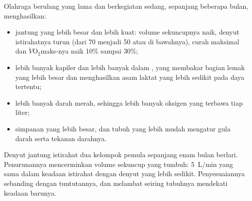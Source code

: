 \begin{proposition}\label{prop:g10:sport-and-health:endurance}
Olahraga berulang yang lama dan berkegiatan sedang, sepanjang beberapa
bulan, menghasilkan:
\begin{itemize}
  \item jantung yang lebih besar dan lebih kuat: volume sekuncupnya
        naik, denyut istirahatnya turun (dari 70 menjadi 50 atau di
        bawahnya), curah maksimal dan $\dot V\!\mathrm{O_2}$maks-nya
        naik 10\% sampai 30\%;
  \item lebih banyak kapiler dan lebih banyak  dalam , yang membakar bagian lemak yang lebih besar dan
        menghasilkan asam laktat yang lebih sedikit pada daya tertentu;
  \item lebih banyak  darah merah, sehingga lebih banyak oksigen
        yang terbawa tiap liter;
  \item simpanan  yang lebih besar, dan tubuh yang lebih mudah
        mengatur gula darah serta tekanan darahnya.
\end{itemize}
\end{proposition}
\admitted

\begin{omfigure}

{\small Denyut jantung istirahat dua kelompok pemula sepanjang enam
bulan berlari. Penurunannya mencerminkan volume sekuncup yang tumbuh:
\qty{5}{L/min} yang sama dalam keadaan istirahat dengan denyut yang
lebih sedikit. Penyesuaiannya sebanding dengan tuntutannya, dan
melambat seiring tubuhnya mendekati keadaan barunya.}
\end{omfigure}


